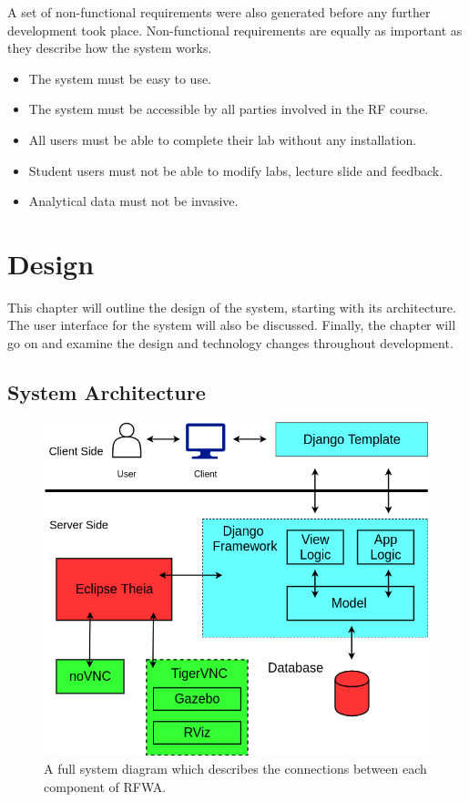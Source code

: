 \documentclass{l4proj}
\begin{document}
A set of non-functional requirements were also generated before any further development took place. Non-functional requirements are equally as important as they describe how the system works.

\begin{itemize}
    \item 
    The system must be easy to use.
    \item 
    The system must be accessible by all parties involved in the RF course.
    \item 
    All users must be able to complete their lab without any installation.
    \item 
    Student users must not be able to modify labs, lecture slide and feedback.
    \item
    Analytical data must not be invasive.
\end{itemize}

\chapter{Design}

This chapter will outline the design of the system, starting with its architecture. The user interface for the system will also be discussed. Finally, the chapter will go on and examine the design and technology changes throughout development.

\section{System Architecture}

\begin{figure}[h]
    \centering
    \includegraphics[scale=0.4]{images/system_architecture.png}
    \caption{A full system diagram which describes the connections between each component of RFWA.}
\end{figure}
\end{document}
